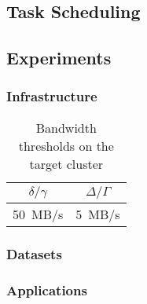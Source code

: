 \documentclass{IEEEtran}
\begin{document}
\subsection{Task Scheduling}


\subsection{Experiments} %

\subsubsection{Infrastructure} %


\begin{table}
\centering
\begin{tabular}{c|c}
$\delta/\gamma$ & $\Delta/\Gamma$\\
\hline
50~MB/s         & 5~MB/s
\end{tabular}
\label{table:infrastructure}
\caption{Bandwidth thresholds on the target cluster}
\end{table}


\subsubsection{Datasets} %


\subsubsection{Applications} %






\end{document}
